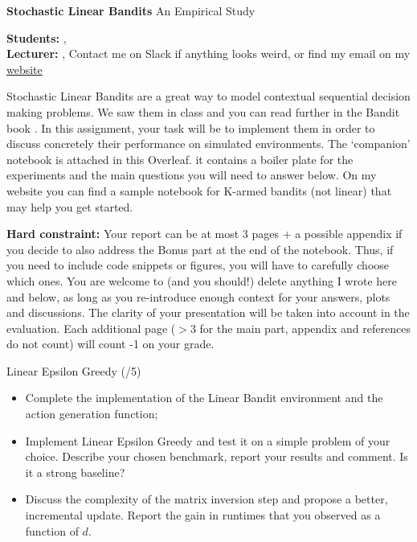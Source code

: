 





\begin{Large}
    \textsf{\textbf{Stochastic Linear Bandits}}
    An Empirical Study
\end{Large}

\vspace{1ex}

\textsf{\textbf{Students:}} , \\
\textsf{\textbf{Lecturer:}} , Contact me on Slack if anything looks weird, or find my email on my \href{www.cvernade.com}{website} 


\vspace{2ex}

Stochastic Linear Bandits are a great way to model contextual sequential decision making problems. We saw them in class and you can read further in the Bandit book \citep{lattimore2020bandit}. In this assignment, your task will be to implement them in order to discuss concretely their performance on simulated environments. The `companion' notebook is attached in this Overleaf. it contains a boiler plate for the experiments and the main questions you will need to answer below. On my website you can find a sample notebook for K-armed bandits (not linear) that may help you get started. 

\textbf{Hard constraint:} Your report can be at most 3 pages + a possible appendix if you decide to also address the Bonus part at the end of the notebook. Thus, if you need to include code snippets or figures, you will have to carefully choose which ones. You are welcome to (and you should!) delete anything I wrote here and below, as long as you re-introduce enough context for your answers, plots and discussions. The clarity of your presentation will be taken into account in the evaluation. Each additional page ($>3$ for the main part, appendix and references do not count) will count -1 on your grade. 

\begin{problem}{Linear Epsilon Greedy (/5)}{}
\begin{itemize}
    \item Complete the implementation of the Linear Bandit environment and the action generation function;
    \item Implement Linear Epsilon Greedy and test it on a simple problem of your choice. Describe your chosen benchmark, report your results and comment. Is it a strong baseline? 
    \item Discuss the complexity of the matrix inversion step and propose a better, incremental update. Report the gain in runtimes that you observed as a function of $d$.
\end{itemize}
\end{problem}

